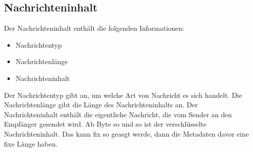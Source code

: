 \subsection{Nachrichteninhalt}

Der Nachrichteninhalt enthält die folgenden Informationen:

\begin{itemize}
    \item Nachrichtentyp
    \item Nachrichtenlänge
    \item Nachrichteninhalt
\end{itemize}

\noindent Der Nachrichtentyp gibt an, um welche Art von Nachricht es sich handelt. Die Nachrichtenlänge gibt die Länge des Nachrichteninhalts an. Der Nachrichteninhalt enthält die eigentliche Nachricht, die vom Sender an den Empfänger gesendet wird. Ab Byte so und so ist der verschlüsselte Nachrichteninhalt. Das kann fix so geasgt werde, dann die Metadaten davor eine fixe Länge haben.